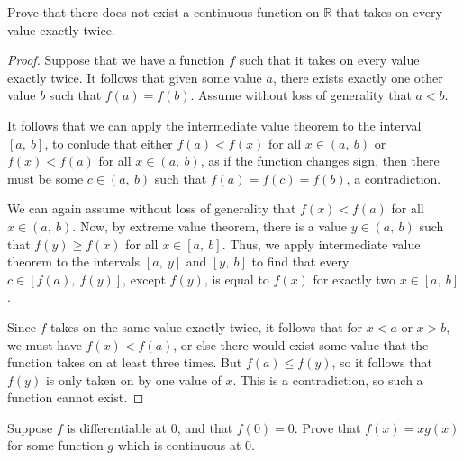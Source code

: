 \documentclass[10pt, oneside]{article}
\newenvironment{problem}[2][Problem]{\begin{trivlist}
\item[\hskip \labelsep {\bfseries #1}\hskip \labelsep {\bfseries #2.}]}{\end{trivlist}}
\begin{document}
    \begin{problem}{10.19b}
      
    \end{problem}

    \begin{problem}{10.20a}
      Prove that there does not exist a continuous function on $\mathbb{R}$ that takes on every value exactly twice.
    \end{problem}

    \begin{proof}
      Suppose that we have a function $f$ such that it takes on every value exactly twice. It follows that given some value $a$, there
      exists exactly one other value $b$ such that $f(a) = f(b)$. Assume without loss of generality that $a < b$.
      \newline

      It follows that we
      can apply the intermediate value theorem to the interval $[a, \ b]$, to conlude that either $f(a) < f(x)$ for all $x \in (a, \ b)$ or $f(x) < f(a)$
      for all $x \in (a, \ b)$, as if the function changes sign, then there must be some $c \in (a, \ b)$ such that $f(a) = f(c) = f(b)$, a contradiction.
      \newline

      We can again assume without loss of generality that $f(x) < f(a)$ for all $x \in (a, \ b)$. Now, by extreme value theorem, there is a value $y \in (a, \ b)$ such that
      $f(y) \geq f(x)$ for all $x \in [a, \ b]$. Thus, we apply intermediate value theorem to the intervals $[a, \ y]$ and $[y, \ b]$ to find that every $c \in [f(a), \ f(y)]$, except $f(y)$,
      is equal to $f(x)$ for exactly two $x \in [a, \ b]$.
      \newline

      Since $f$ takes on the same value exactly twice, it follows that for $x < a$ or $x > b$, we must have $f(x) < f(a)$, or else there would exist some value that the function takes on at least
      three times. But $f(a) \leq f(y)$, so it follows that $f(y)$ is only taken on by one value of $x$. This is a contradiction, so such a function cannot exist.
    \end{proof}

    \begin{problem}{10.27}
      Suppose $f$ is differentiable at $0$, and that $f(0) = 0$. Prove that $f(x) = x g(x)$ for some function $g$ which is continuous at $0$.
    \end{problem}
\end{document}
